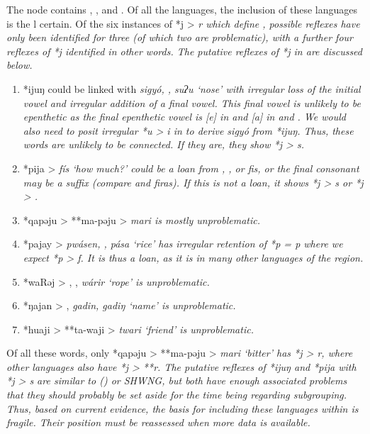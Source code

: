 The  node contains , , and .
Of all the  languages,
the inclusion of these languages is the l certain.
Of the six instances of *j > \it{r} which define ,
possible reflexes have only been identified for three (of which
two are problematic), with a further four reflexes of *j identified in other words.
The putative reflexes of *j in  are
discussed below.

\begin{enumerate}
	\item	*ijuŋ could be linked with  \it{sigyó},
				,  \it{suʔu} ‘nose’ with irregular loss of the
				initial vowel and irregular addition of a final vowel.
				This final vowel is unlikely to be epenthetic as the final epenthetic
				vowel is [e] in 
				and [a] in  and .
				We would also need to posit irregular *u > \it{i} in  to
				derive \it{sigyó} from *ijuŋ.
				Thus, these words are unlikely to be connected.
				If they are, they show *j > \it{s}.
	\item	*pija >  \it{fís} ‘how much?’ could be a loan from
				, , or  \it{fis}, or the final consonant may be a suffix
				(compare  and  \it{firas}).
				If this is not a loan,
				it shows *j > \it{s} or *j > {\0}.
	\item	*qapəju > **ma-pəju >  \it{mari} is mostly unproblematic.
	\item	*pajay >  \it{pwásen},
				,  \it{pása} ‘rice’ has irregular retention
				of *p = \it{p} where we expect *p > \it{f}.
				It is thus a loan,
				as it is in many other languages of the region.
	\item	*waRəj > ,
				,  \it{wárir} ‘rope’ is unproblematic.
	\item	*ŋajan > ,
				 \it{gadin},  \it{gadiŋ} ‘name’ is unproblematic.
	\item	*huaji > **ta-waji >  \it{twari} ‘friend’ is unproblematic.
\end{enumerate}

Of all these words,
only *qapəju > **ma-pəju >  \it{mari} ‘bitter’ has *j >
\it{r,} where other  languages also have *j > **r.
The putative reflexes of *ijuŋ
and *pija with *j > \it{s} are similar to 
() or SHWNG, but both have enough associated problems that they should probably
be set aside for the time being regarding subgrouping.
Thus, based on current evidence,
the basis for including these languages within  is fragile.
Their position must be reassessed when more data is available.

